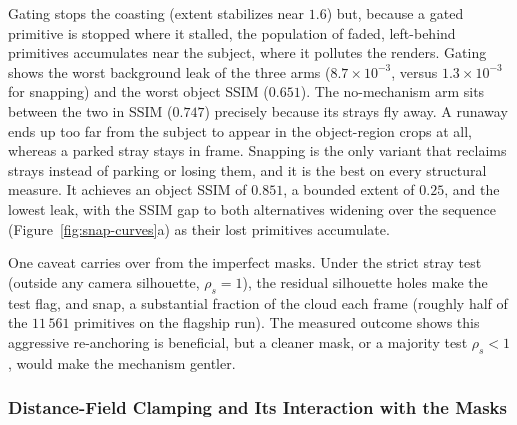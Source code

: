 Gating stops the coasting (extent stabilizes near $1.6$) but, because a gated
primitive is stopped where it stalled, the population of faded, left-behind
primitives accumulates near the subject, where it pollutes the renders. Gating
shows the worst background leak of the three arms ($8.7\times10^{-3}$, versus
$1.3\times10^{-3}$ for snapping) and the worst object SSIM ($0.651$). The
no-mechanism arm sits between the two in SSIM ($0.747$) precisely because its
strays fly away. A runaway ends up too far from the subject to appear in the
object-region crops at all, whereas a parked stray stays in frame. Snapping is
the only variant that reclaims strays instead of parking or losing them, and it
is the best on every structural measure. It achieves an object SSIM of $0.851$, a
bounded extent of $0.25$, and the lowest leak, with the SSIM gap to both
alternatives widening over the sequence (Figure~\ref{fig:snap-curves}a) as their
lost primitives accumulate.

One caveat carries over from the imperfect masks. Under the strict stray test
(outside any camera silhouette, $\rho_s = 1$), the residual silhouette holes make
the test flag, and snap, a substantial fraction of the cloud each frame (roughly
half of the $11\,561$ primitives on the flagship run). The measured outcome shows
this aggressive re-anchoring is beneficial, but a cleaner mask, or a
majority test $\rho_s < 1$, would make the mechanism gentler.

\subsubsection{Distance-Field Clamping and Its Interaction with the Masks}
\label{sec:results-snapmargin}

